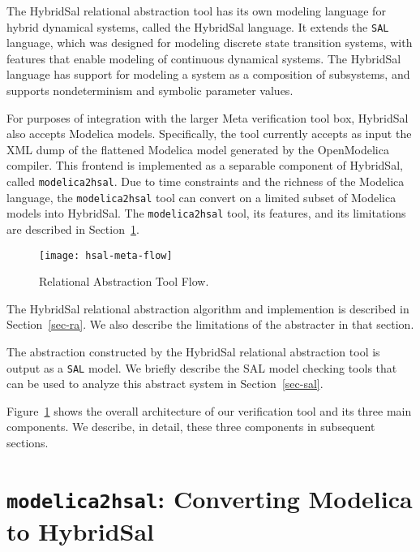 \documentclass{llncs}
\begin{document}
The HybridSal relational abstraction tool has its own modeling 
language for hybrid dynamical systems, called the HybridSal language.
It extends the {\tt{SAL}} language, which was designed for modeling discrete state 
transition systems, with features that enable modeling of continuous
dynamical systems.  The HybridSal language has support for modeling
a system as a composition of subsystems, and supports nondeterminism
and symbolic parameter values.

For purposes of integration with the larger Meta verification tool box,
HybridSal also accepts Modelica models.
Specifically, the tool currently accepts as input the XML dump of the
flattened Modelica model generated by the OpenModelica compiler.
This frontend is implemented as a separable component of HybridSal,
called {\tt{modelica2hsal}}.
Due to time constraints and the richness of the Modelica language,
the {\tt{modelica2hsal}} tool can convert on a
limited subset of Modelica models into HybridSal.  
The {\tt{modelica2hsal}} tool, its features, and its limitations
are described in Section~\ref{sec-modelica2hsal}.

\begin{figure}[t]
\begin{center}
\texttt{[image: hsal-meta-flow]}
\end{center}
\caption{Relational Abstraction Tool Flow.}\label{fig-flow}
\end{figure}

The HybridSal relational abstraction algorithm and implemention is
described in Section~\ref{sec-ra}.  We also describe the limitations
of the abstracter in that section.

The abstraction constructed by the HybridSal relational abstraction tool
is output as a {\tt{SAL}} model.  We briefly describe the SAL model
checking tools that can be used to analyze this abstract system 
in Section~\ref{sec-sal}.

Figure~\ref{fig-flow} shows the overall architecture of our
verification tool and its three main components.  We describe, in
detail, these three components in subsequent sections.

\section{{\tt{modelica2hsal}}: Converting Modelica to HybridSal}
\label{sec-modelica2hsal}
\end{document}
